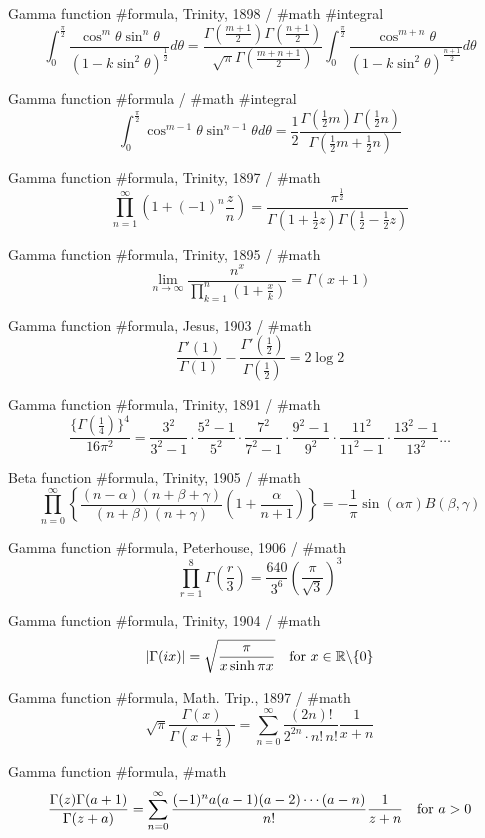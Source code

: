 Gamma function #formula, Trinity, 1898 / #math #integral 
$$
\int^{\frac{\pi}{2}}_0 \frac{\cos^m\theta \sin^n\theta}{(1-k\sin^2\theta)^{\frac{1}{2}}}d\theta=\frac{\Gamma\left(\frac{m+1}{2}\right)\Gamma\left(\frac{n+1}{2}\right)}{\sqrt{\pi}\Gamma\left(\frac{m+n+1}{2}\right)}\int^{\frac{\pi}{2}}_0\frac{\cos^{m+n}\theta}{(1-k\sin^2\theta)^{\frac{n+1}{2}}}d\theta
$$

Gamma function #formula / #math #integral 
$$
\int^{\frac{\pi}{2}}_0 \cos^{m-1}\theta \sin^{n-1}\theta d\theta=\frac{1}{2}\frac{\Gamma\left(\frac{1}{2}m\right)\Gamma\left(\frac{1}{2}n\right)}{\Gamma\left(\frac{1}{2}m+\frac{1}{2}n\right)}
$$

Gamma function #formula, Trinity, 1897 / #math 
$$
\prod_{n=1}^\infty \left(1+(-1)^n \frac{z}{n}\right)=\frac{\pi^{\frac{1}{2}}}{\Gamma\left(1+\frac{1}{2}z\right)\Gamma\left(\frac{1}{2}-\frac{1}{2}z\right)}
$$

Gamma function #formula, Trinity, 1895 / #math
$$
\lim_{n\rightarrow\infty}\frac{n^x}{\displaystyle\prod_{k=1}^n \left(1+\frac{x}{k}\right)}=\Gamma(x+1)
$$

Gamma function #formula, Jesus, 1903 / #math
$$
\frac{\Gamma'(1)}{\Gamma(1)}-\frac{\Gamma'\left(\frac{1}{2}\right)}{\Gamma\left(\frac{1}{2}\right)}=2\log 2
$$

Gamma function #formula, Trinity, 1891 / #math
$$
\frac{\{\Gamma(\frac{1}{4})\}^4}{16\pi^2}=\frac{3^2}{3^2-1}\cdot\frac{5^2-1}{5^2}\cdot\frac{7^2}{7^2-1}\cdot\frac{9^2-1}{9^2}\cdot\frac{11^2}{11^2-1}\cdot\frac{13^2-1}{13^2}\ldots
$$

Beta function #formula, Trinity, 1905 / #math
$$
\displaystyle\prod^\infty_{n=0}\left\{\frac{(n-\alpha)(n+\beta+\gamma)}{(n+\beta)(n+\gamma)}\left(1+\frac{\alpha}{n+1}\right)\right\}=-\frac{1}{\pi}\sin(\alpha\pi)B(\beta,\gamma)
$$

Gamma function #formula, Peterhouse, 1906 / #math
$$
\displaystyle\prod^8_{r=1}\Gamma\left(\frac{r}{3}\right)=\frac{640}{3^6}\left(\frac{\pi}{\sqrt{3}}\right)^3
$$

Gamma function #formula, Trinity, 1904 / #math
$$
|\Gamma(ix)|=\sqrt{\frac{\pi}{x\sinh \pi x}}\quad{\rm for}\,\,x \in {\mathbb R}\backslash \{0\}
$$

Gamma function #formula, Math. Trip., 1897 / #math
$$
\sqrt{\pi}\frac{\Gamma(x)}{\Gamma(x+\frac{1}{2})}=\sum^\infty_{n=0}\frac{(2n)!}{2^{2n}\cdot n! \, n!}\frac{1}{x+n}
$$

Gamma function #formula, #math
$$
\frac{\Gamma(z)\Gamma(a+1)}{\Gamma(z+a)}=\sum^\infty_{n=0}\frac{(-1)^n a(a-1)(a-2)\cdots(a-n)}{n!}\frac{1}{z+n} \quad {\rm for}\,\, a>0
$$

